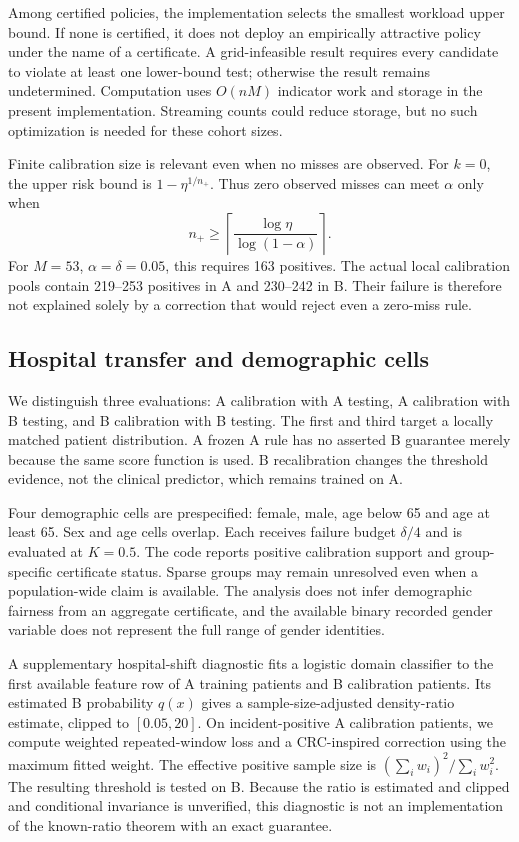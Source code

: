 Among certified policies, the implementation selects the smallest workload upper bound. If none is certified, it does not deploy an empirically attractive policy under the name of a certificate. A grid-infeasible result requires every candidate to violate at least one lower-bound test; otherwise the result remains undetermined. Computation uses $O(nM)$ indicator work and storage in the present implementation. Streaming counts could reduce storage, but no such optimization is needed for these cohort sizes.

Finite calibration size is relevant even when no misses are observed. For $k=0$, the upper risk bound is $1-\eta^{1/n_+}$. Thus zero observed misses can meet $\alpha$ only when
\begin{equation}
 n_+\ge \left\lceil\frac{\log\eta}{\log(1-\alpha)}\right\rceil.
 \label{eq:cal-floor}
\end{equation}
For $M=53$, $\alpha=\delta=0.05$, this requires 163 positives. The actual local calibration pools contain 219--253 positives in A and 230--242 in B. Their failure is therefore not explained solely by a correction that would reject even a zero-miss rule.

\subsection{Hospital transfer and demographic cells}
We distinguish three evaluations: A calibration with A testing, A calibration with B testing, and B calibration with B testing. The first and third target a locally matched patient distribution. A frozen A rule has no asserted B guarantee merely because the same score function is used. B recalibration changes the threshold evidence, not the clinical predictor, which remains trained on A.

Four demographic cells are prespecified: female, male, age below 65 and age at least 65. Sex and age cells overlap. Each receives failure budget $\delta/4$ and is evaluated at $K=0.5$. The code reports positive calibration support and group-specific certificate status. Sparse groups may remain unresolved even when a population-wide claim is available. The analysis does not infer demographic fairness from an aggregate certificate, and the available binary recorded gender variable does not represent the full range of gender identities.

A supplementary hospital-shift diagnostic fits a logistic domain classifier to the first available feature row of A training patients and B calibration patients. Its estimated B probability $q(x)$ gives a sample-size-adjusted density-ratio estimate, clipped to $[0.05,20]$. On incident-positive A calibration patients, we compute weighted repeated-window loss and a CRC-inspired correction using the maximum fitted weight. The effective positive sample size is $(\sum_i w_i)^2/\sum_i w_i^2$. The resulting threshold is tested on B. Because the ratio is estimated and clipped and conditional invariance is unverified, this diagnostic is not an implementation of the known-ratio theorem with an exact guarantee.

